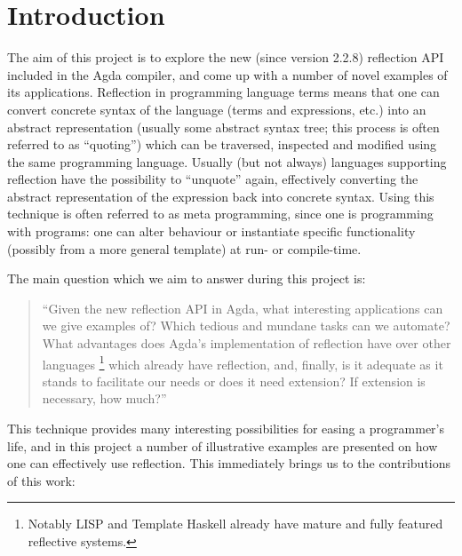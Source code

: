 \section{Introduction}

The aim of this project is to explore the new (since version 2.2.8) reflection API included in the Agda
compiler, and come up with a number of novel examples of its applications. Reflection in programming language
terms means that one can convert concrete syntax of the language (terms and expressions, etc.) into an abstract
representation (usually some abstract syntax tree; this process is often referred to as ``quoting'')
which can be traversed, inspected and modified using the same programming
language. Usually (but not always) languages supporting reflection have the possibility to
``unquote'' again, effectively
converting the abstract representation of the expression back into concrete syntax. Using this technique is often referred to as meta programming,
since one is programming with programs: one can alter behaviour
or instantiate specific functionality (possibly from a more general template) at run- or compile-time.

The main question which we aim to answer during this project is:


\begin{quote}
``Given the new reflection API in Agda, what interesting applications can we give
examples of? Which tedious and mundane tasks can we automate? What advantages
does Agda's implementation of reflection have over other languages
\footnote{Notably LISP and Template Haskell already have mature and fully
featured reflective systems.} which already have reflection, and, finally, is
it adequate as it stands to facilitate our needs or does it need extension? If
extension is necessary, how much?''
\end{quote}


This technique provides many interesting possibilities for easing a programmer's life, and in
this project a number of illustrative
examples are presented on how one can effectively use reflection.
This immediately brings us to the contributions of this work:

